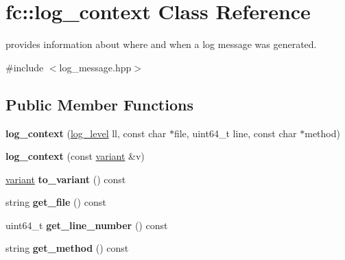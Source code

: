 \hypertarget{classfc_1_1log__context}{}\section{fc\+:\+:log\+\_\+context Class Reference}
\label{classfc_1_1log__context}


provides information about where and when a log message was generated.  




{\ttfamily \#include $<$log\+\_\+message.\+hpp$>$}

\subsection*{Public Member Functions}
\begin{DoxyCompactItemize}
\item 
\mbox{\label{classfc_1_1log__context_aedcb779fc5dac38fb7a2c78880eb61a4}} 
{\bfseries log\+\_\+context} (\mbox{\hyperlink{classfc_1_1log__level}{log\+\_\+level}} ll, const char $\ast$file, uint64\+\_\+t line, const char $\ast$method)
\item 
\mbox{\label{classfc_1_1log__context_a4dd50551f679b724c87f9ea129b6afe3}} 
{\bfseries log\+\_\+context} (const \mbox{\hyperlink{classfc_1_1variant}{variant}} \&v)
\item 
\mbox{\label{classfc_1_1log__context_ac6a95f997d99c873434051960e91c19a}} 
\mbox{\hyperlink{classfc_1_1variant}{variant}} {\bfseries to\+\_\+variant} () const
\item 
\mbox{\label{classfc_1_1log__context_a52164ce433aa8c079e962ac816bb8098}} 
string {\bfseries get\+\_\+file} () const
\item 
\mbox{\label{classfc_1_1log__context_a9439a7a8b5550f0a6f73a322976ad0ad}} 
uint64\+\_\+t {\bfseries get\+\_\+line\+\_\+number} () const
\item 
\mbox{\label{classfc_1_1log__context_a221af1499de04d0f15f956703c728785}} 
string {\bfseries get\+\_\+method} () const
\item 
\mbox{\label{classfc_1_1log__context_a269b101c3a42ef2f44c8f37bde10c5d5}} 

\end{DoxyCompactItemize}
